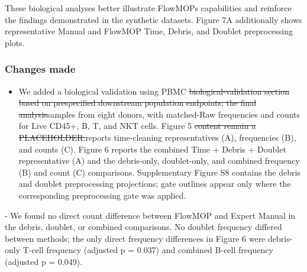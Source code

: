 \documentclass[
  11pt,
  a4paper,
]{article}
\providecommand{\tightlist}{%
  \setlength{\itemsep}{0pt}\setlength{\parskip}{0pt}}
\begin{document}
{\color{revisionblue}These biological analyses better illustrate
FlowMOP\textquotesingle s capabilities and reinforce the findings
demonstrated in the synthetic datasets. Figure 7A additionally shows
representative Manual and FlowMOP Time, Debris, and Doublet
preprocessing plots.}

\subsubsection{Changes made}\label{changes-made-2}

\begin{itemize}
\tightlist
\item
  We added a {\color{revisionblue}biological validation using} PBMC
  {\color{revisionred}\sout{biological-validation section based on
  prespecified downstream population endpoints; the final
  analysis}}{\color{revisionblue}samples from eight donors, with
  matched-Raw frequencies and counts for Live CD45+, B, T,} and
  {\color{revisionblue}NKT cells.} Figure 5
  {\color{revisionred}\sout{content remain a
  PLACEHOLDER.}}{\color{revisionblue}reports time-cleaning
  representatives (A), frequencies (B), and counts (C). Figure 6 reports
  the combined Time + Debris + Doublet representative (A) and the
  debris-only, doublet-only, and combined frequency (B) and count (C)
  comparisons. Supplementary Figure S8 contains the debris and doublet
  preprocessing projections; gate outlines appear only where the
  corresponding preprocessing gate was applied.}
\end{itemize}

{\color{revisionblue}- We found no direct count difference between
FlowMOP and Expert Manual in the debris, doublet, or combined
comparisons. No doublet frequency differed between methods; the only
direct frequency differences in Figure 6 were debris-only T-cell
frequency (adjusted p = 0.037) and combined B-cell frequency (adjusted p
= 0.049).}
\end{document}
